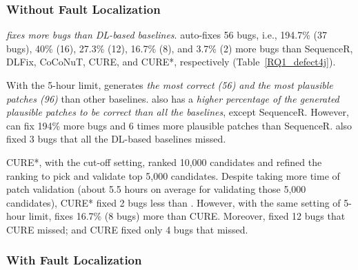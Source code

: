 \subsubsection{{\bf Without Fault Localization}}

{\em {\tool} fixes more bugs than DL-based baselines}. {\tool}
auto-fixes 56 bugs, i.e., 194.7\% (37 bugs), 40\% (16), 27.3\% (12),
16.7\% (8), and 3.7\% (2) more bugs than Sequen\-ceR, DLFix, CoCoNuT,
CURE, and CURE*, respectively (Table~\ref{RQ1_defect4j}).

With the 5-hour limit, {\tool} generates {\em the most correct (56)
  and the most plausible patches (96)} than other baselines.  {\tool}
also has a {\em higher percentage of the generated plausible patches
  to be correct than all the baselines}, except SequenceR.
However, {\tool} can fix 194\% more bugs and 6 times more plausible
patches than SequenceR.
{\tool} also fixed 3 bugs that all the DL-based baselines missed.


CURE*, with the cut-off setting, ranked 10,000 candidates and refined
the ranking to pick and validate top 5,000 candidates. Despite taking
more time of patch validation (about 5.5 hours on average for
validating those 5,000 candidates), CURE* fixed 2 bugs less than
{\tool}. However, with the same setting of 5-hour limit, {\tool} fixes
16.7\% (8 bugs) more than CURE. Moreover, {\tool} fixed 12 bugs that
CURE missed; and CURE fixed only 4 bugs that {\tool} missed.



\vspace{-6pt}
\subsubsection{{\bf With Fault Localization}}

